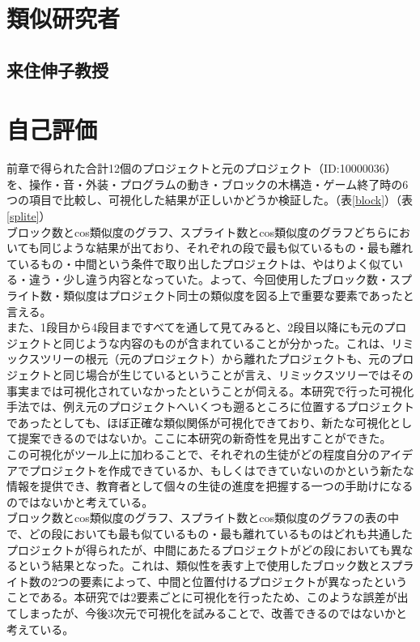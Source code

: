 \documentclass[a4paper,10pt,onecolumn,oneside,openany]{jsbook}
\begin{document}
\section{類似研究者}
\subsection{来住伸子教授}
\section{自己評価}
前章で得られた合計12個のプロジェクトと元のプロジェクト（ID:10000036）を、操作・音・外装・プログラムの動き・ブロックの木構造・ゲーム終了時の6つの項目で比較し、可視化した結果が正しいかどうか検証した。（表\ref{block}）（表\ref{splite}）
\\
ブロック数とcos類似度のグラフ、スプライト数とcos類似度のグラフどちらにおいても同じような結果が出ており、それぞれの段で最も似ているもの・最も離れているもの・中間という条件で取り出したプロジェクトは、やはりよく似ている・違う・少し違う内容となっていた。よって、今回使用したブロック数・スプライト数・類似度はプロジェクト同士の類似度を図る上で重要な要素であったと言える。
\\
また、1段目から4段目まですべてを通して見てみると、2段目以降にも元のプロジェクトと同じような内容のものが含まれていることが分かった。これは、リミックスツリーの根元（元のプロジェクト）から離れたプロジェクトも、元のプロジェクトと同じ場合が生じているということが言え、リミックスツリーではその事実までは可視化されていなかったということが伺える。本研究で行った可視化手法では、例え元のプロジェクトへいくつも遡るところに位置するプロジェクトであったとしても、ほぼ正確な類似関係が可視化できており、新たな可視化として提案できるのではないか。ここに本研究の新奇性を見出すことができた。
\\
この可視化がツール上に加わることで、それぞれの生徒がどの程度自分のアイデアでプロジェクトを作成できているか、もしくはできていないのかという新たな情報を提供でき、教育者として個々の生徒の進度を把握する一つの手助けになるのではないかと考えている。
\\
ブロック数とcos類似度のグラフ、スプライト数とcos類似度のグラフの表の中で、どの段においても最も似ているもの・最も離れているものはどれも共通したプロジェクトが得られたが、中間にあたるプロジェクトがどの段においても異なるという結果となった。これは、類似性を表す上で使用したブロック数とスプライト数の2つの要素によって、中間と位置付けるプロジェクトが異なったということである。本研究では2要素ごとに可視化を行ったため、このような誤差が出てしまったが、今後3次元で可視化を試みることで、改善できるのではないかと考えている。
\\
\\
\\
 
\end{document}
